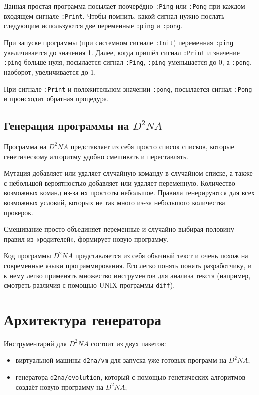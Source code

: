 \documentclass[utf8,a5paper,portrait,12pt]{eskdtext}
\begin{document}
Данная простая программа посылает поочерёдно \texttt{:Ping} или \texttt{:Pong}
при каждом входящем сигнале \texttt{:Print}. Чтобы помнить, какой сигнал нужно
послать следующим используются две переменные \texttt{:ping} и \texttt{:pong}.

При запуске программы (при системном сигнале \texttt{:Init}) переменная
\texttt{:ping} увеличивается до значения 1. Далее, когда пришёл сигнал
\texttt{:Print} и значение \texttt{:ping} больше нуля, посылается сигнал
\texttt{:Ping}, \texttt{:ping} уменьшается до 0, а \texttt{:pong}, наоборот,
увеличивается до 1.

При сигнале \texttt{:Print} и положительном значении \texttt{:pong}, посылается
сигнал \texttt{:Pong} и происходит обратная процедура.

\subsection{Генерация программы на $D^2NA$}
Программа на $D^2NA$ представляет из себя просто список списков, которые
генетическому алгоритму удобно смешивать и переставлять.

Мутация добавляет или удаляет случайную команду в случайном списке, а также с
небольшой вероятностью добавляет или удаляет переменную. Количество возможных
команд из-за их простоты небольшое. Правила генерируются для всех возможных
условий, которых не так много из-за небольшого количества проверок.

Смешивание просто объединяет переменные и случайно выбирая половину правил из
«родителей», формирует новую программу.

Код программы $D^2NA$ представляется из себя обычный текст и очень похож на
современные языки программирования. Его легко понять понять разработчику,
и к нему легко применять множество инструментов для анализа текста (например,
смотреть различия с помощью UNIX-программы \texttt{diff}).

\newpage
\section{Архитектура генератора}

Инструментарий для $D^2NA$ состоит из двух пакетов:
\begin{itemize}
  \item виртуальной машины \texttt{d2na/vm} для запуска уже готовых программ на
        $D^2NA$;
  \item генератора \texttt{d2na/evolution}, который с помощью генетических
        алгоритмов создаёт новую программу на $D^2NA$;
\end{itemize}
\end{document}
